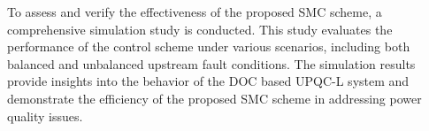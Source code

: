 To assess and verify the effectiveness of the proposed SMC scheme, a comprehensive simulation study is conducted. This study evaluates the performance of the control scheme under various scenarios, including both balanced and unbalanced upstream fault conditions. The simulation results provide insights into the behavior of the DOC based UPQC-L system and demonstrate the efficiency of the proposed SMC scheme in addressing power quality issues. 